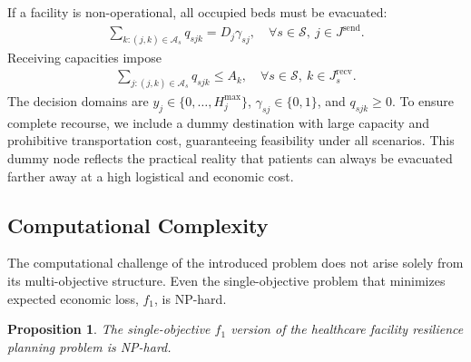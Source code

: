 \documentclass[preprint,11pt,authoryear]{elsarticle}
\newtheorem{proposition}{Proposition}
\begin{document}
If a facility is non-operational, all occupied beds must be evacuated:
\begin{align*}
 \sum_{k:(j,k)\in\mathcal{A}_s} q_{sjk}
 =D_j\gamma_{sj},
 \quad \forall s\in\mathcal{S},\ j\in J^{\mathrm{send}}.
\end{align*}
Receiving capacities impose
\begin{align}
 \sum_{j:(j,k)\in\mathcal{A}_s}q_{sjk}
 \leq A_k,
 \quad \forall s\in\mathcal{S},\ k\in J_s^{\mathrm{recv}}.
 \label{eq:recv_capacity}
\end{align}
The decision domains are $y_j\in\{0,\ldots,H_j^{\max}\}$, $\gamma_{sj}\in\{0,1\}$, and $q_{sjk}\geq0$. To ensure complete recourse, we include a dummy destination with large capacity and prohibitive transportation cost, guaranteeing feasibility under all scenarios. This dummy node reflects the practical reality that patients can always be evacuated farther away at a high logistical and economic cost.


\subsection{Computational Complexity}
\label{sec:complexity}

The computational challenge of the introduced problem does not arise solely from
its multi-objective structure. Even the single-objective problem that minimizes
expected economic loss, \(f_1\), is NP-hard.

\begin{proposition}
The single-objective \(f_1\) version of the healthcare facility resilience planning problem is NP-hard.
\end{proposition}
\end{document}
